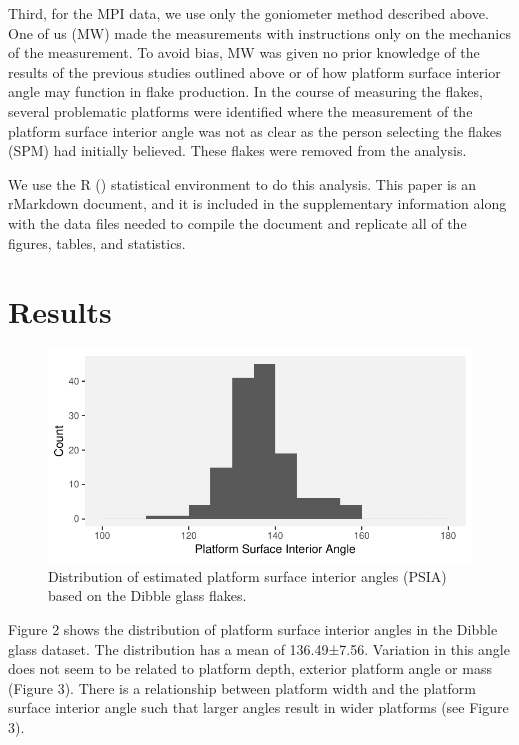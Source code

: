 \documentclass[10pt,letterpaper]{article}
\begin{document}
Third, for the MPI data, we use only the goniometer method described
above. One of us (MW) made the measurements with instructions only on
the mechanics of the measurement. To avoid bias, MW was given no prior
knowledge of the results of the previous studies outlined above or of
how platform surface interior angle may function in flake production. In
the course of measuring the flakes, several problematic platforms were
identified where the measurement of the platform surface interior angle
was not as clear as the person selecting the flakes (SPM) had initially
believed. These flakes were removed from the analysis.

We use the R () statistical environment to do this analysis. This paper
is an rMarkdown document, and it is included in the supplementary
information along with the data files needed to compile the document and
replicate all of the figures, tables, and statistics.

\hypertarget{results}{%
\section{Results}\label{results}}

\begin{figure}
\centering
\includegraphics{PSIA_Manuscript_files/figure-latex/fig2-test_1_angles-1.pdf}
\caption{Distribution of estimated platform surface interior angles
(PSIA) based on the Dibble glass flakes.}
\end{figure}

Figure 2 shows the distribution of platform surface interior angles in
the Dibble glass dataset. The distribution has a mean of 136.49±7.56.
Variation in this angle does not seem to be related to platform depth,
exterior platform angle or mass (Figure 3). There is a relationship
between platform width and the platform surface interior angle such that
larger angles result in wider platforms (see Figure 3).
\end{document}
